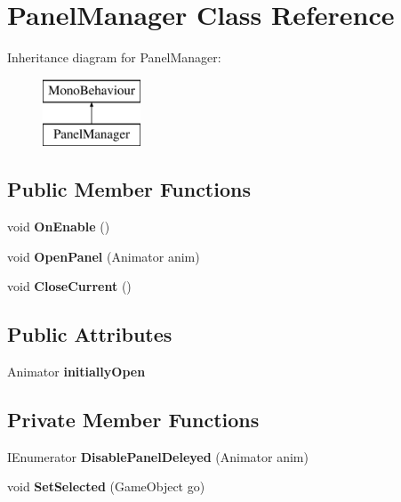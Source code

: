 \hypertarget{class_panel_manager}{}\section{Panel\+Manager Class Reference}
\label{class_panel_manager}
Inheritance diagram for Panel\+Manager\+:\begin{figure}[H]
\begin{center}
\leavevmode
\includegraphics[height=2.000000cm]{class_panel_manager}
\end{center}
\end{figure}
\subsection*{Public Member Functions}
\begin{DoxyCompactItemize}
\item 
\mbox{\label{class_panel_manager_a0351f0296fa5902f2035ab437083a76e}} 
void {\bfseries On\+Enable} ()
\item 
\mbox{\label{class_panel_manager_af1769c53f71e90af68c32871516a0154}} 
void {\bfseries Open\+Panel} (Animator anim)
\item 
\mbox{\label{class_panel_manager_af40a6b89e9c49aea0d61f3ef56c95a0a}} 
void {\bfseries Close\+Current} ()
\end{DoxyCompactItemize}
\subsection*{Public Attributes}
\begin{DoxyCompactItemize}
\item 
\mbox{\label{class_panel_manager_a5d60b81acd2faa9bace895505ddc6a6c}} 
Animator {\bfseries initially\+Open}
\end{DoxyCompactItemize}
\subsection*{Private Member Functions}
\begin{DoxyCompactItemize}
\item 
\mbox{\label{class_panel_manager_a61ebdcc801ebd8bed43b0c7c781e75e1}} 
I\+Enumerator {\bfseries Disable\+Panel\+Deleyed} (Animator anim)
\item 
\mbox{\label{class_panel_manager_a154ca9d96dcd011358b53fcfe40e9152}} 
void {\bfseries Set\+Selected} (Game\+Object go)
\end{DoxyCompactItemize}
